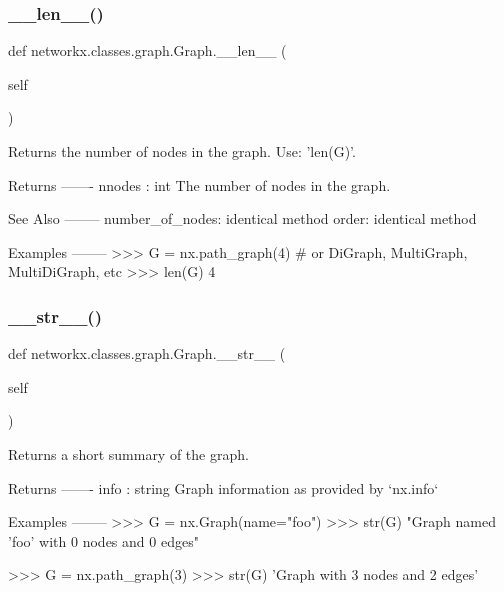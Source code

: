 \subsubsection{\texorpdfstring{\+\_\+\+\_\+len\+\_\+\+\_\+()}{\_\_len\_\_()}}
{\footnotesize\ttfamily def networkx.\+classes.\+graph.\+Graph.\+\_\+\+\_\+len\+\_\+\+\_\+ (\begin{DoxyParamCaption}\item[{}]{self }\end{DoxyParamCaption})}

\begin{DoxyVerb}Returns the number of nodes in the graph. Use: 'len(G)'.

Returns
-------
nnodes : int
    The number of nodes in the graph.

See Also
--------
number_of_nodes: identical method
order: identical method

Examples
--------
>>> G = nx.path_graph(4)  # or DiGraph, MultiGraph, MultiDiGraph, etc
>>> len(G)
4\end{DoxyVerb}
 \mbox{\label{classnetworkx_1_1classes_1_1graph_1_1Graph_a0729f1d954c500b397108089589c106b}} 
\subsubsection{\texorpdfstring{\+\_\+\+\_\+str\+\_\+\+\_\+()}{\_\_str\_\_()}}
{\footnotesize\ttfamily def networkx.\+classes.\+graph.\+Graph.\+\_\+\+\_\+str\+\_\+\+\_\+ (\begin{DoxyParamCaption}\item[{}]{self }\end{DoxyParamCaption})}

\begin{DoxyVerb}Returns a short summary of the graph.

Returns
-------
info : string
    Graph information as provided by `nx.info`

Examples
--------
>>> G = nx.Graph(name="foo")
>>> str(G)
"Graph named 'foo' with 0 nodes and 0 edges"

>>> G = nx.path_graph(3)
>>> str(G)
'Graph with 3 nodes and 2 edges'\end{DoxyVerb}
 \mbox{\label{classnetworkx_1_1classes_1_1graph_1_1Graph_a2e456eed10460a4d9c1c32347d32e46d}} 
